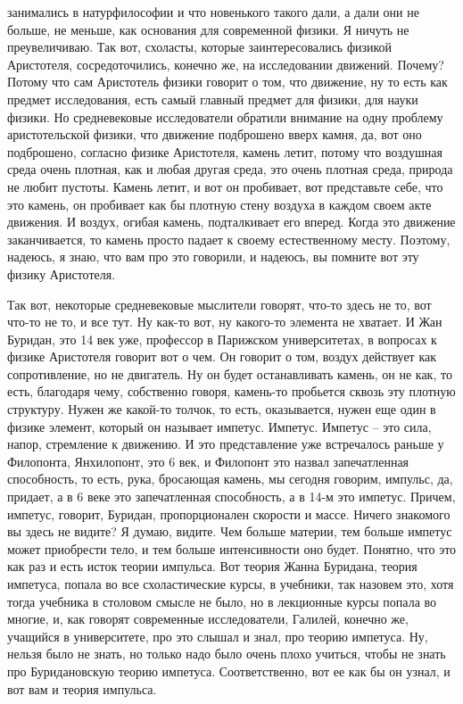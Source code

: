 занимались в натурфилософии и что новенького такого дали, а дали они не больше,
не меньше, как основания для современной физики. Я ничуть не преувеличиваю. Так
вот, схоласты, которые заинтересовались физикой Аристотеля, сосредоточились,
конечно же, на исследовании движений. Почему? Потому что сам Аристотель физики
говорит о том, что движение, ну то есть как предмет исследования, есть самый
главный предмет для физики, для науки физики. Но средневековые исследователи
обратили внимание на одну проблему аристотельской физики, что движение
подброшено вверх камня, да, вот оно подброшено, согласно физике Аристотеля,
камень летит, потому что воздушная среда очень плотная, как и любая другая
среда, это очень плотная среда, природа не любит пустоты. Камень летит, и вот он
пробивает, вот представьте себе, что это камень, он пробивает как бы плотную
стену воздуха в каждом своем акте движения. И воздух, огибая камень,
подталкивает его вперед. Когда это движение заканчивается, то камень просто
падает к своему естественному месту. Поэтому, надеюсь, я знаю, что вам про это
говорили, и надеюсь, вы помните вот эту физику Аристотеля. 

Так вот, некоторые
средневековые мыслители говорят, что-то здесь не то, вот что-то не то, и все
тут. Ну как-то вот, ну какого-то элемента не хватает. И Жан Буридан, это 14 век
уже, профессор в Парижском университетах, в вопросах к физике Аристотеля говорит
вот о чем. Он говорит о том, воздух действует как сопротивление, но не
двигатель. Ну он будет останавливать камень, он не как, то есть, благодаря чему,
собственно говоря, камень-то пробьется сквозь эту плотную структуру. Нужен же
какой-то толчок, то есть, оказывается, нужен еще один в физике элемент, который
он называет импетус. Импетус. Импетус – это сила, напор, стремление к движению.
И это представление уже встречалось раньше у Филопонта, Янхилопонт, это 6 век, и
Филопонт это назвал запечатленная способность, то есть, рука, бросающая камень,
мы сегодня говорим, импульс, да, придает, а в 6 веке это запечатленная
способность, а в 14-м это импетус. Причем, импетус, говорит, Буридан,
пропорционален скорости и массе. Ничего знакомого вы здесь не видите? Я думаю,
видите. Чем больше материи, тем больше импетус может приобрести тело, и тем
больше интенсивности оно будет. Понятно, что это как раз и есть исток теории
импульса. Вот теория Жанна Буридана, теория импетуса, попала во все
схоластические курсы, в учебники, так назовем это, хотя тогда учебника в
столовом смысле не было, но в лекционные курсы попала во многие, и, как говорят
современные исследователи, Галилей, конечно же, учащийся в университете, про это
слышал и знал, про теорию импетуса. Ну, нельзя было не знать, но только надо
было очень плохо учиться, чтобы не знать про Буридановскую теорию импетуса.
Соответственно, вот ее как бы он узнал, и вот вам и теория импульса. 

